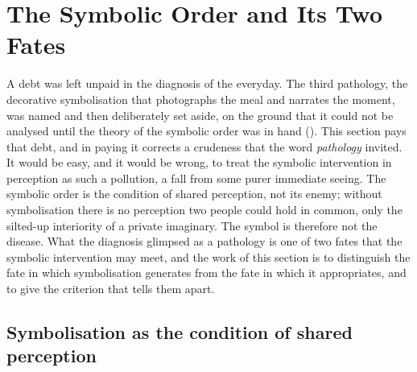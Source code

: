 \section{The Symbolic Order and Its Two Fates}
\label{p23:sec:symbolic}

\noindent
A debt was left unpaid in the diagnosis of the everyday. The third pathology, the decorative symbolisation that photographs the meal and narrates the moment, was named and then deliberately set aside, on the ground that it could not be analysed until the theory of the symbolic order was in hand (). This section pays that debt, and in paying it corrects a crudeness that the word \emph{pathology} invited. It would be easy, and it would be wrong, to treat the symbolic intervention in perception as such a pollution, a fall from some purer immediate seeing. The symbolic order is the condition of shared perception, not its enemy; without symbolisation there is no perception two people could hold in common, only the silted-up interiority of a private imaginary. The symbol is therefore not the disease. What the diagnosis glimpsed as a pathology is one of two fates that the symbolic intervention may meet, and the work of this section is to distinguish the fate in which symbolisation generates from the fate in which it appropriates, and to give the criterion that tells them apart.

\subsection{Symbolisation as the condition of shared perception}
\label{p23:sub:sym-condition}

